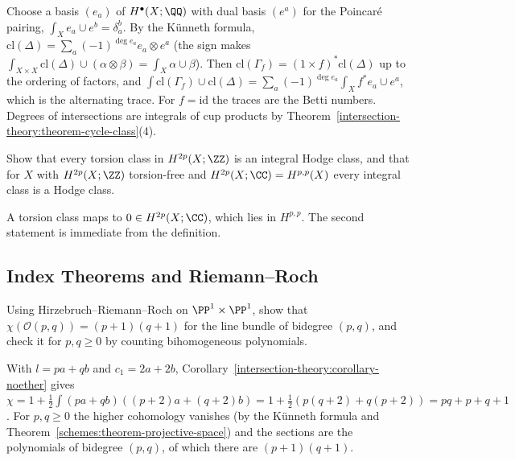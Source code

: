 \begin{solution}
Choose a basis $(e_a)$ of $H^\bullet(X; \QQ)$ with dual basis $(e^a)$ for the Poincar\'e pairing, $\int_Xe_a \cup e^b = \delta_a^b$. By the K\"unneth formula,
$\mathrm{cl}(\Delta) = \sum_a(-1)^{\deg e_a}e_a \otimes e^a$ (the sign makes $\int_{X \times X}\mathrm{cl}(\Delta) \cup (\alpha \otimes \beta) = \int_X\alpha \cup \beta$). Then
$\mathrm{cl}(\Gamma_f) = (1 \times f)^*\mathrm{cl}(\Delta)$ up to the ordering of factors, and $\int\mathrm{cl}(\Gamma_f) \cup \mathrm{cl}(\Delta) = \sum_a(-1)^{\deg e_a}\int_Xf^*e_a \cup e^a$, which is the
alternating trace. For $f = \mathrm{id}$ the traces are the Betti numbers. Degrees of intersections are integrals of cup products by Theorem~\ref{intersection-theory:theorem-cycle-class}(4).
\end{solution}

\begin{exercise}\label{intersection-theory:exercise-torsion-hodge}
Show that every torsion class in $H^{2p}(X; \ZZ)$ is an integral Hodge class, and that for $X$ with $H^{2p}(X; \ZZ)$ torsion-free and $H^{2p}(X; \CC) = H^{p,p}(X)$ every integral class is a
Hodge class.
\end{exercise}

\begin{solution}
A torsion class maps to $0 \in H^{2p}(X; \CC)$, which lies in $H^{p,p}$. The second statement is immediate from the definition.
\end{solution}

\subsection{Index Theorems and Riemann--Roch}\label{intersection-theory:subsection-exercises-index-theorems}

\begin{exercise}\label{intersection-theory:exercise-quadric}
Using Hirzebruch--Riemann--Roch on $\PP^1 \times \PP^1$, show that $\chi(\mathcal{O}(p, q)) = (p + 1)(q + 1)$ for the line bundle of bidegree $(p, q)$, and check it for $p, q \geq 0$ by counting bihomogeneous polynomials.
\end{exercise}

\begin{solution}
With $l = pa + qb$ and $c_1 = 2a + 2b$, Corollary~\ref{intersection-theory:corollary-noether} gives $\chi = 1 + \frac12\int(pa + qb)((p + 2)a + (q + 2)b) = 1 + \frac12(p(q + 2) + q(p + 2)) = pq + p + q + 1$. For $p, q \geq 0$ the higher cohomology
vanishes (by the K\"unneth formula and Theorem~\ref{schemes:theorem-projective-space}) and the sections are the polynomials of bidegree $(p, q)$, of which there are $(p + 1)(q + 1)$.
\end{solution}

